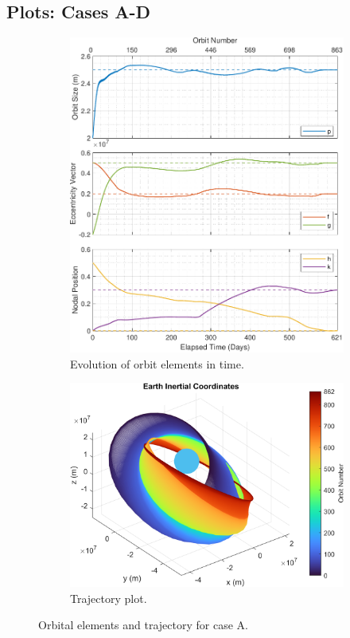 \subsection{Plots: Cases A-D}
\begin{figure}[H]
    \centering
    \begin{subfigure}[t]{0.4\textwidth}
        \includegraphics[width=\textwidth]{figures/benchmark_transfer/orbital_elements.pdf}
        \caption{Evolution of orbit elements in time.}
        \label{fig:results_a_a}
    \end{subfigure}
    \begin{subfigure}[t]{0.59\textwidth}
        \includegraphics[width=\textwidth]{figures/benchmark_transfer/trajectory_plot.png}
        \caption{Trajectory plot.}
        \label{fig:results_a_b}
    \end{subfigure}
    \caption{Orbital elements and trajectory for case A.}
    \label{fig:results_a}
\end{figure}
